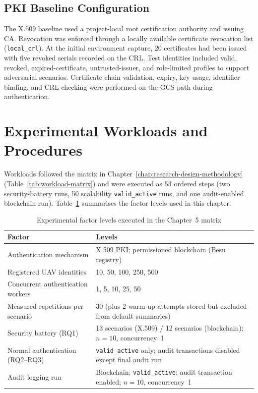 \subsection{PKI Baseline Configuration}
\label{sec:ch5-pki-config}

The X.509 baseline used a project-local root certification authority and issuing CA. Revocation was enforced through a locally available certificate revocation list (\texttt{local\_crl}). At the initial environment capture, 20 certificates had been issued with five revoked serials recorded on the CRL. Test identities included valid, revoked, expired-certificate, untrusted-issuer, and role-limited profiles to support adversarial scenarios. Certificate chain validation, expiry, key usage, identifier binding, and CRL checking were performed on the GCS path during authentication.

\section{Experimental Workloads and Procedures}
\label{sec:ch5-workloads}

Workloads followed the matrix in Chapter~\ref{chap:research-design-methodology} (Table~\ref{tab:workload-matrix}) and were executed as 53 ordered steps (two security-battery runs, 50 scalability \texttt{valid\_active} runs, and one audit-enabled blockchain run). Table~\ref{tab:ch5-factor-levels} summarises the factor levels used in this chapter.

\begin{table}[htbp]
    \centering
    \caption{Experimental factor levels executed in the Chapter~5 matrix}
    \label{tab:ch5-factor-levels}
    \begin{tabular}{|p{}|p{}|}
        \hline
        \textbf{Factor} & \textbf{Levels} \\
        \hline
        Authentication mechanism & X.509 PKI; permissioned blockchain (Besu registry) \\
        \hline
        Registered UAV identities & 10, 50, 100, 250, 500 \\
        \hline
        Concurrent authentication workers & 1, 5, 10, 25, 50 \\
        \hline
        Measured repetitions per scenario & 30 (plus 2 warm-up attempts stored but excluded from default summaries) \\
        \hline
        Security battery (RQ1) & 13 scenarios (X.509) / 12 scenarios (blockchain); $n=10$, concurrency~1 \\
        \hline
        Normal authentication (RQ2--RQ3) & \texttt{valid\_active} only; audit transactions disabled except final audit run \\
        \hline
        Audit logging run & Blockchain; \texttt{valid\_active}; audit transaction enabled; $n=10$, concurrency~1 \\
        \hline
    \end{tabular}
\end{table}

